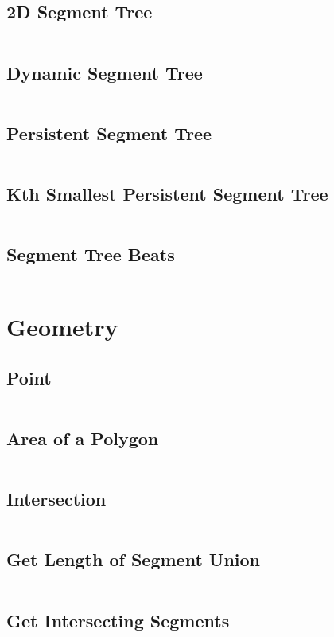 \documentclass[a4paper, 8pt, landscape, oneside]{extarticle}
\begin{document}
\begin{multicols*}{3}
		\subsection{2D Segment Tree}
		\inputminted{cpp}{src/ds/segtree2d.cpp}
		\subsection{Dynamic Segment Tree}
		\inputminted{cpp}{src/ds/dynsegtree.cpp}
		\subsection{Persistent Segment Tree}
		\inputminted{cpp}{src/ds/persegtree.cpp}
		\subsection{Kth Smallest Persistent Segment Tree}
		\inputminted{cpp}{src/ds/kspersegtree.cpp}
		\subsection{Segment Tree Beats}
		\inputminted{cpp}{src/ds/segtreebeats.cpp}
	\section{Geometry}
		\subsection{Point}
		\inputminted{cpp}{src/geometry/point.cpp}
		\subsection{Area of a Polygon}
		\inputminted{cpp}{src/geometry/polyarea.cpp}
		\subsection{Intersection}
		\inputminted{cpp}{src/geometry/intersection.cpp}
		\subsection{Get Length of Segment Union}
		\inputminted{cpp}{src/geometry/getlensegunion.cpp}
		\subsection{Get Intersecting Segments}
		\inputminted{cpp}{src/geometry/getintersectingsegs.cpp}

\end{multicols*}
\end{document}
